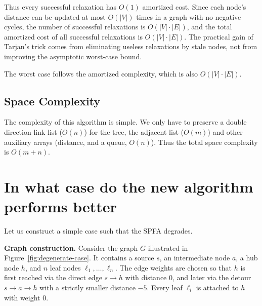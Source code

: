 \documentclass[a4paper]{article}
\theoremstyle{definition}
\begin{document}
Thus every successful relaxation has $O(1)$ amortized cost. Since each node's distance can be updated at most $O(|V|)$ times in a graph with no negative cycles, the number of successful relaxations is $O(|V| \cdot |E|)$, and the total amortized cost of all successful relaxations is $O(|V| \cdot |E|)$. The practical gain of Tarjan's trick comes from eliminating useless relaxations by stale nodes, not from improving the asymptotic worst-case bound.

The worst case follows the amortized complexity, which is also $O(|V|\cdot |E|)$.

\subsection{Space Complexity} 

The complexity of this algorithm is simple. We only have to preserve a double direction link list ($O(n)$) for the tree, the adjacent list ($O(m)$) and other auxiliary arrays (distance, and a queue, $O(n)$). Thus the total space complexity is $O(m + n)$.

\section{In what case do the new algorithm performs better} 

Let us construct a simple case such that the SPFA degrades.

\textbf{Graph construction.} Consider the graph $G$ illustrated in Figure~\ref{fig:degenerate-case}. It contains a source $s$, an intermediate node $a$, a hub node $h$, and $n$ leaf nodes $\ell_1, \dots, \ell_n$. The edge weights are chosen so that $h$ is first reached via the direct edge $s \to h$ with distance $0$, and later via the detour $s \to a \to h$ with a strictly smaller distance $-5$. Every leaf $\ell_i$ is attached to $h$ with weight $0$.
\end{document}
